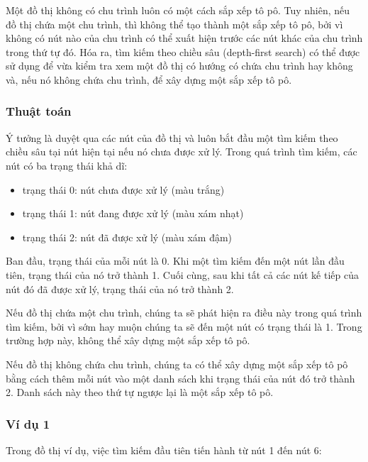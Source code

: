 Một đồ thị không có chu trình luôn có một cách sắp xếp tô pô.
Tuy nhiên, nếu đồ thị chứa một chu trình,
thì không thể tạo thành một sắp xếp tô pô,
bởi vì không có nút nào của chu trình có thể xuất hiện
trước các nút khác của chu trình trong thứ tự đó.
Hóa ra, tìm kiếm theo chiều sâu (depth-first search) có thể được sử dụng
để vừa kiểm tra xem một đồ thị có hướng có chứa chu trình hay không
và, nếu nó không chứa chu trình, để xây dựng một sắp xếp tô pô.

\subsubsection{Thuật toán}

Ý tưởng là duyệt qua các nút của đồ thị
và luôn bắt đầu một tìm kiếm theo chiều sâu tại nút hiện tại
nếu nó chưa được xử lý.
Trong quá trình tìm kiếm, các nút có ba trạng thái khả dĩ:

\begin{itemize}
\item trạng thái 0: nút chưa được xử lý (màu trắng)
\item trạng thái 1: nút đang được xử lý (màu xám nhạt)
\item trạng thái 2: nút đã được xử lý (màu xám đậm)
\end{itemize}

Ban đầu, trạng thái của mỗi nút là 0.
Khi một tìm kiếm đến một nút lần đầu tiên,
trạng thái của nó trở thành 1.
Cuối cùng, sau khi tất cả các nút kế tiếp của nút đó đã
được xử lý, trạng thái của nó trở thành 2.

Nếu đồ thị chứa một chu trình, chúng ta sẽ phát hiện ra điều này
trong quá trình tìm kiếm, bởi vì sớm hay muộn
chúng ta sẽ đến một nút có trạng thái là 1.
Trong trường hợp này, không thể xây dựng một sắp xếp tô pô.

Nếu đồ thị không chứa chu trình, chúng ta có thể xây dựng
một sắp xếp tô pô bằng cách
thêm mỗi nút vào một danh sách khi trạng thái của nút đó trở thành 2.
Danh sách này theo thứ tự ngược lại là một sắp xếp tô pô.

\subsubsection{Ví dụ 1}

Trong đồ thị ví dụ, việc tìm kiếm đầu tiên tiến hành
từ nút 1 đến nút 6:

